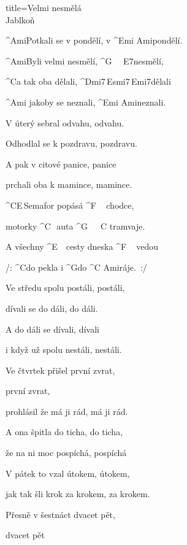 \begin{song}{title=\predtitle\centering Velmi nesmělá \\\large Jablkoň  \vspace*{-0.3cm}}  %
\begin{centerjustified}

\begin{varwidth}[t]{0.48\textwidth}\setlength{\parindent}{0.45cm}  %
\sloka
	^{Ami\z}Potkali se v pondělí, v ^{Emi Ami\z}pondělí.\:\:\:
	
	^{Ami}Byli velmi nesmělí, ^{G\,\,\,\,\,\,\,\,E7}nesmělí,
	
	^{C}a tak oba dělali, ^{Dmi7\,Esmi7\,Emi7}dělali
	
	^{Ami\,\,}jakoby se neznali, ^{Emi Ami\z}neznali.\:\:\:
	
	
\sloka
	V úterý sebral odvahu, odvahu.
	
	Odhodlal se k pozdravu, pozdravu.
	
	A pak v citové panice, panice
	
	prchali oba k mamince, mamince.

	^{C{\z}E\,}Semafor popásá ^{F\,\,\,\,\,\,\,}chodce,
	
	motorky ^{C\,\,\,\,}auta ^{G\,\,\,\,\,\,\,\,\,C\,\,}tramvaje.
	
	A všechny ^{E\,\,\,\,\,\,}cesty dneska ^{F\,\,\,\,\,\,\,}vedou
	
	/: ^{C}do pekla i ^{G}do ^{C Ami\z}ráje.~:/
	
\sloka
	Ve středu spolu postáli, postáli,
	
	dívali se do dáli, do dáli.
	
	A do dáli se dívali, dívali
	
	i když už spolu nestáli, nestáli.
	

\sloka
	Ve čtvrtek přišel první zvrat,
	
	první zvrat,
	
	prohlásil že má ji rád, má ji rád.
	
	A ona špitla do ticha, do ticha,
	
	že na ni moc pospíchá, pospíchá


\sloka
	V pátek to vzal útokem, útokem,
	
	jak tak šli krok za krokem, za krokem.
	
	Přesně v šestnáct dvacet pět,

	dvacet pět
	

\end{varwidth}
\end{centerjustified}
\end{song}
